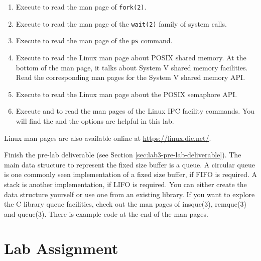 \begin{enumerate}
\item Execute  to read the man page of \verb+fork(2)+.
\item Execute  to read the man page of the \verb+wait(2)+ family of system calls.
\item Execute  to read the man page of the \verb+ps+ command.
\item Execute  to read the Linux man page about POSIX shared memory. At the bottom of the man page, it talks about System V shared memory facilities. Read the corresponding man pages for the System V shared memory API.
\item Execute  to read the Linux man page about the POSIX semaphore API.
\item Execute  and  to read the man pages of the Linux IPC facility commands. You will find the  and the  options are helpful in this lab.  
\end{enumerate}
Linux man pages are also available online at \url{https://linux.die.net/}.

Finish the pre-lab deliverable (see Section \ref{sec:lab3-pre-lab-deliverable}).
The main data structure to represent the fixed size buffer is a queue. A circular queue is one commonly seen implementation of a fixed size buffer, if FIFO is required. A stack is another implementation, if LIFO is required. You can either create the data structure yourself or use one from an existing library. If you want to explore the C library queue facilities, check out the man pages of insque(3), remque(3) and queue(3). There is example code at the end of the man pages.

\section{Lab Assignment}
